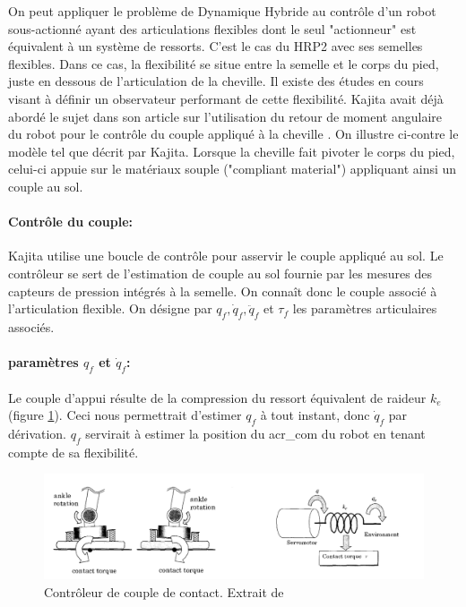 \documentclass{report}
\begin{document}
On peut appliquer le problème de Dynamique Hybride au contrôle d'un robot sous-actionné ayant des articulations flexibles dont le seul "actionneur" est équivalent à un système de ressorts. C'est le cas du HRP2 avec ses semelles flexibles. Dans ce cas, la flexibilité se situe entre la semelle et le corps du pied, juste en dessous de l'articulation de la cheville. Il existe des études en cours visant à définir un observateur performant de cette flexibilité. Kajita avait déjà abordé le sujet dans son article sur l'utilisation du retour de moment angulaire du robot pour le contrôle du couple appliqué à la cheville \cite{bib_backdrive}. On illustre ci-contre le modèle tel que décrit par Kajita. Lorsque la cheville fait pivoter le corps du pied, celui-ci appuie sur le matériaux souple ("compliant material") appliquant ainsi un couple au sol.
\paragraph{Contrôle du couple:} Kajita utilise une boucle de contrôle pour asservir le couple appliqué au sol. Le contrôleur se sert de l'estimation de couple au sol fournie par les mesures des capteurs de pression intégrés à la semelle. On connaît donc le couple associé à l'articulation flexible. On désigne par $q_f, \dot{q}_f, \ddot{q}_f$ et $\tau_f$ les paramètres articulaires associés.
\paragraph{paramètres $q_f$ et $\dot{q}_f$:} Le couple d'appui résulte de la compression du ressort équivalent de raideur $k_e$ (figure \ref{fig_hrp2ankle}). Ceci nous permettrait d'estimer $q_f$ à tout instant, donc $\dot{q}_f$ par dérivation. $q_f$ servirait à estimer la position du \gls{acr_com} du robot en tenant compte de sa flexibilité.

\begin{figure}[h]
  \centering
  \includegraphics[width=\textwidth]{figs/contactTorque.png}
  \caption{Contrôleur de couple de contact. Extrait de \cite[figure 2,3]{bib_backdrive}}
  \label{fig_hrp2ankle}
\end{figure}
\end{document}
